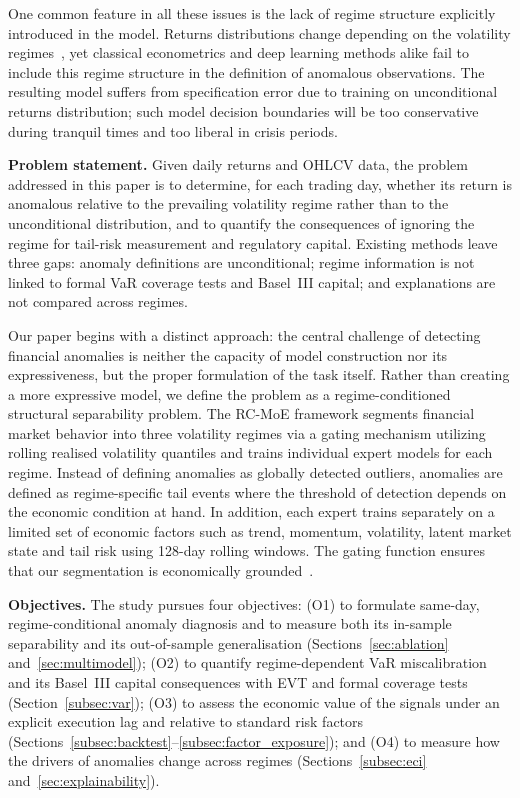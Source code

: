 \documentclass[]{interact}
\begin{document}
One common feature in all these issues is the lack of regime
structure explicitly introduced in the model. Returns distributions change depending on the volatility regimes~\citep{hamilton1989a, ang2002regime, guidolin2011markov},
yet classical econometrics and deep learning methods alike fail
to include this regime structure in the definition of anomalous
observations. The resulting model suffers from specification
error due to training on unconditional returns distribution;
such model decision boundaries will be too conservative during tranquil times and too liberal in crisis periods. 

\textbf{Problem statement.} Given daily returns and OHLCV data, the problem addressed in this paper is to determine, for each trading day, whether its return is anomalous relative to the prevailing volatility regime rather than to the unconditional distribution, and to quantify the consequences of ignoring the regime for tail-risk measurement and regulatory capital. Existing methods leave three gaps: anomaly definitions are unconditional; regime information is not linked to formal VaR coverage tests and Basel~III capital; and explanations are not compared across regimes.

Our paper begins with a distinct approach: the central challenge of detecting financial anomalies is neither the capacity
of model construction nor its expressiveness, but the proper formulation of the task itself. Rather than creating a more expressive model, we define the problem as a regime-conditioned
structural separability problem. The RC-MoE framework segments financial market behavior into three volatility regimes
via a gating mechanism utilizing rolling realised volatility
quantiles and trains individual expert models for each regime.
Instead of defining anomalies as globally detected outliers,
anomalies are defined as regime-specific tail events where
the threshold of detection depends on the economic condition at hand. In addition, each expert trains separately on a
limited set of economic factors such as trend, momentum,
volatility, latent market state and tail risk using 128-day rolling windows. The gating function ensures that our segmentation is
economically grounded~\citep{jacobs1991moe, alkilane2024mixma}.

\textbf{Objectives.} The study pursues four objectives: (O1) to formulate same-day, regime-conditional anomaly diagnosis and to measure both its in-sample separability and its out-of-sample generalisation (Sections~\ref{sec:ablation} and~\ref{sec:multimodel}); (O2) to quantify regime-dependent VaR miscalibration and its Basel~III capital consequences with EVT and formal coverage tests (Section~\ref{subsec:var}); (O3) to assess the economic value of the signals under an explicit execution lag and relative to standard risk factors (Sections~\ref{subsec:backtest}--\ref{subsec:factor_exposure}); and (O4) to measure how the drivers of anomalies change across regimes (Sections~\ref{subsec:eci} and~\ref{sec:explainability}).
\end{document}

